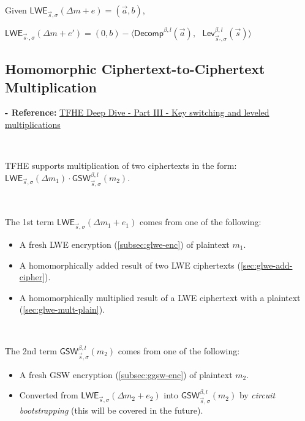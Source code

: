 \begin{tcolorbox}[title={\textbf{\tboxlabel{\ref*{subsec:tfhe-key-switching}} TFHE Key Switching}}]

Given $\textsf{LWE}_{\vec{s},\sigma}(\Delta m + e) = (\vec{a}, b)$,

$\textsf{LWE}_{\vec{s}_{'},\sigma}(\Delta m + e') = (0, b) - \bm{\langle} \textsf{Decomp}^{\beta, l}(\vec{a}), \text{ } \textsf{Lev}_{\vec{s}_{'}, \sigma}^{\beta, l}(\vec{s}) \bm{\rangle}$
\end{tcolorbox}


\subsection{Homomorphic Ciphertext-to-Ciphertext Multiplication}
\label{subsec:tfhe-mult-cipher}

\textbf{- Reference:} 
\href{https://www.zama.ai/post/tfhe-deep-dive-part-3}{TFHE Deep Dive - Part III - Key switching and leveled multiplications}~\cite{tfhe-3}

$ $

TFHE supports multiplication of two ciphertexts in the form: $\textsf{LWE}_{\vec{s}, \sigma}(\Delta m_1) \cdot \textsf{GSW}_{\vec{s}, \sigma}^{\beta, l}(m_2)$. 

$ $

\noindent The 1st term $\textsf{LWE}_{\vec{s}, \sigma}(\Delta m_1 + e_1)$ comes from one of the following: 
\begin{itemize}
\item A fresh LWE encryption (\autoref{subsec:glwe-enc}) of plaintext $m_1$. 
\item A homomorphically added result of two LWE ciphertexts (\autoref{sec:glwe-add-cipher}). 
\item A homomorphically multiplied result of a LWE ciphertext with a plaintext (\autoref{sec:glwe-mult-plain}). 
\end{itemize}

$ $

\noindent The 2nd term $\textsf{GSW}_{\vec{s}, \sigma}^{\beta, l}(m_2)$ comes from one of the following:
\begin{itemize}
\item A fresh GSW encryption (\autoref{subsec:ggsw-enc}) of plaintext $m_2$.
\item Converted from $\textsf{LWE}_{\vec{s}, \sigma}(\Delta m_2 + e_2)$ into $\textsf{GSW}_{\vec{s}, \sigma}^{\beta, l}(m_2)$ by \textit{circuit bootstrapping} (this will be covered in the future).
\end{itemize}

